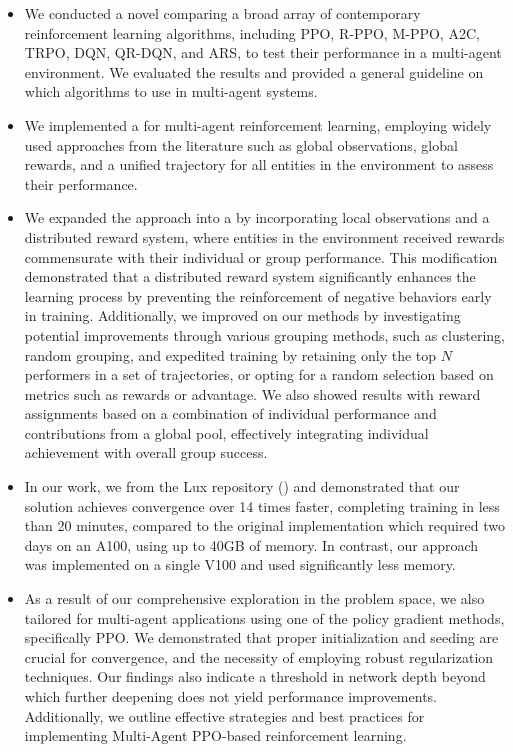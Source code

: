 \begin{itemize}[itemsep=1pt, parsep=0pt]

\item We conducted a novel  comparing a broad array of contemporary reinforcement learning algorithms, including PPO, R-PPO, M-PPO, A2C, TRPO, DQN, QR-DQN, and ARS, to test their performance in a multi-agent environment. We evaluated the results and provided a general guideline on which algorithms to use in multi-agent systems.

\item We implemented a  for multi-agent reinforcement learning, employing widely used approaches from the literature such as global observations, global rewards, and a unified trajectory for all entities in the environment to assess their performance.

\item We expanded the approach into a  by incorporating local observations and a distributed reward system, where entities in the environment received rewards commensurate with their individual or group performance. This modification demonstrated that a distributed reward system significantly enhances the learning process by preventing the reinforcement of negative behaviors early in training. Additionally, we improved on our methods by investigating potential improvements through various grouping methods, such as clustering, random grouping, and expedited training by retaining only the top $N$ performers in a set of trajectories, or opting for a random selection based on metrics such as rewards or advantage. We also showed results with reward assignments based on a combination of individual performance and contributions from a global pool, effectively integrating individual achievement with overall group success. 

\item In our work, we  from the Lux repository (\textcolor{deepblue}{\cite{luxai_s2-baseline-source}}) and demonstrated that our solution achieves convergence over 14 times faster, completing training in less than 20 minutes, compared to the original implementation which required two days on an A100, using up to 40GB of memory. In contrast, our approach was implemented on a single V100 and used significantly less memory.

\item As a result of our comprehensive exploration in the problem space, we also  tailored for multi-agent applications using one of the policy gradient methods, specifically PPO. We demonstrated that proper initialization and seeding are crucial for convergence, and the necessity of employing robust regularization techniques. Our findings also indicate a threshold in network depth beyond which further deepening does not yield performance improvements. Additionally, we outline effective strategies and best practices for implementing Multi-Agent PPO-based reinforcement learning.

\end{itemize}


